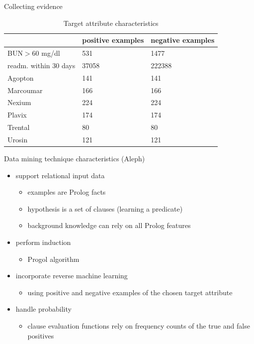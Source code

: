 \documentclass{beamer}
\begin{document}
\begin{frame}{Collecting evidence}
\begin{table}[!ht]  
  \centering
  \begin{tabularx}{\textwidth}{| l | l | X |}
    \cline{2-3}
    \multicolumn{1}{l|}{} 
    & positive examples & negative examples \\ \hline
    BUN$>$60 mg/dl & 531 & 1477 \\
    readm. within 30 days & 37058 & 222388 \\ 
    Agopton & 141 & 141 \\
    Marcoumar & 166 & 166 \\
    Nexium & 224 & 224 \\
    Plavix & 174 & 174 \\
    Trental & 80 & 80 \\
    Urosin & 121 & 121 \\ \hline
  \end{tabularx}
\caption {Target attribute characteristics}
  \label{evidence-table}
\end{table}
\end{frame}

\begin{frame}{Data mining technique characteristics (Aleph)}
  \begin{itemize}
  \item support relational input data \pause 
    \begin{itemize}
      \item examples are Prolog facts
      \item hypothesis is a set of clauses (learning a predicate)
      \item background knowledge can rely on all Prolog features \pause
    \end{itemize} 
  \item perform induction \pause
    \begin{itemize}
    \item Progol algorithm \pause
    \end{itemize}
  \item incorporate reverse machine learning \pause
    \begin{itemize}
      \item using positive and negative examples of the chosen target attribute \pause
    \end{itemize}
  \item handle probability \pause
    \begin{itemize}
      \item clause evaluation functions rely on frequency counts of the true and false positives
    \end{itemize}

  \end{itemize}
\end{frame}
\end{document}
